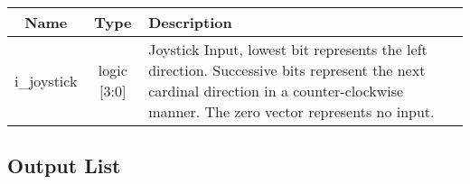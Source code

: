 \documentclass[12pt]{article}
\begin{document}
\begingroup
{}
\label{tab:input_game_state}
\begin{tabularx}{\linewidth}{ ||c|c|X|| }
    \hline
    Name & Type & Description \\
    \hline
    i\_joystick & logic [3:0] & Joystick Input, lowest bit represents the left
    direction. Successive bits represent the next cardinal direction in a
    counter-clockwise manner. The zero vector represents no input. \\
    \hline
\end{tabularx}
\endgroup

\subsection{Output List} 
\end{document}
